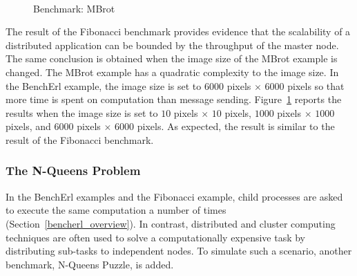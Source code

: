 \begin{figure}[p]
\begin{center}
{        }
        \\
    \end{center}
    \caption{Benchmark: MBrot}
   \label{mbrot_efficiency}
\end{figure}

The result of the Fibonacci benchmark provides evidence that the scalability
of a distributed application can be bounded by the throughput of the master node.
The same conclusion is obtained when the image size of the MBrot example
is changed.   The MBrot example has a quadratic complexity 
to the image size.  In the BenchErl example, the image size is set to $6000$ 
pixels $ \times$  $ 6000$ pixels so that more time is spent on computation than 
message sending.  Figure~\ref{mbrot_efficiency} reports the results when the 
image size is set to $10$ pixels $ \times$  $ 10$ pixels, $1000$ pixels $ 
\times$  $ 1000$ pixels, and $6000$ pixels $ \times$  $ 6000$ pixels.   As 
expected, the result is similar to the result of the Fibonacci benchmark.  

\subsubsection{The N-Queens Problem}

In the BenchErl examples and the Fibonacci example, child processes are asked to 
execute the same computation a number of times (Section~\ref{bencherl_overview}).  In contrast, distributed and 
cluster computing techniques are often used to solve a computationally 
expensive task by distributing sub-tasks to independent nodes.  To simulate 
such a scenario, another benchmark, N-Queens Puzzle, is added. 

